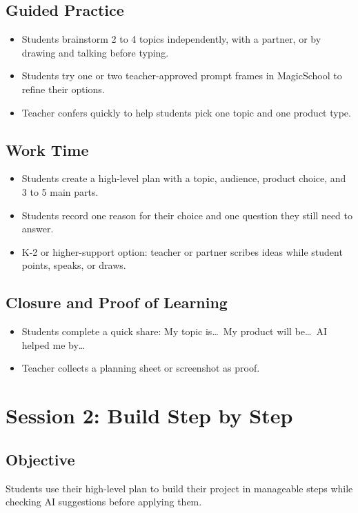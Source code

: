 \documentclass[11pt]{article}
\begin{document}
\subsection*{Guided Practice}
\begin{itemize}
\item Students brainstorm 2 to 4 topics independently, with a partner, or by drawing and talking before typing.
\item Students try one or two teacher-approved prompt frames in MagicSchool to refine their options.
\item Teacher confers quickly to help students pick one topic and one product type.
\end{itemize}

\subsection*{Work Time}
\begin{itemize}
\item Students create a high-level plan with a topic, audience, product choice, and 3 to 5 main parts.
\item Students record one reason for their choice and one question they still need to answer.
\item K-2 or higher-support option: teacher or partner scribes ideas while student points, speaks, or draws.
\end{itemize}

\subsection*{Closure and Proof of Learning}
\begin{itemize}
\item Students complete a quick share: My topic is\ldots\ My product will be\ldots\ AI helped me by\ldots
\item Teacher collects a planning sheet or screenshot as proof.
\end{itemize}

\section*{Session 2: Build Step by Step}
\subsection*{Objective}
Students use their high-level plan to build their project in manageable steps while checking AI suggestions before applying them.
\end{document}
